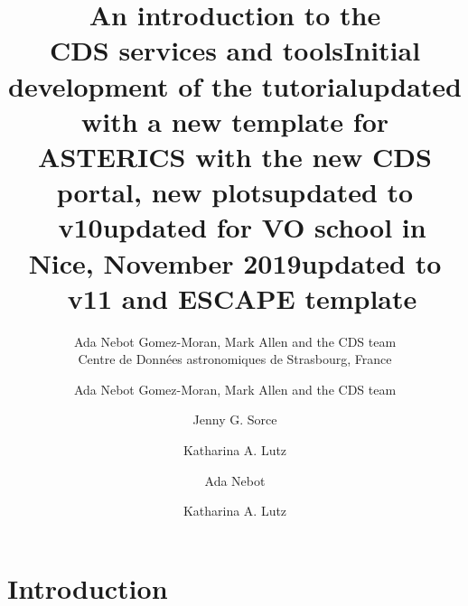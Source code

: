 \documentclass [a4paper, 12pt]{article}
\begin{document}
\author{Ada Nebot Gomez-Moran, Mark Allen and the CDS team \\      %
Centre de Donn\'ees astronomiques de Strasbourg, France}       %
\title{An introduction to the \\ CDS services and tools}   %
\makeescapetitle

\newpage
\author{Ada Nebot Gomez-Moran, Mark Allen and the CDS team}   %
\title{Initial development of the tutorial}  %
\addescapehistory
\author{Jenny G. Sorce}
\title{updated with a new template for ASTERICS with the new CDS portal, new plots}
\addescapehistory
\author{Katharina A. Lutz}
\title{updated to \aladin\ v10}
\addescapehistory
\author{Ada Nebot}
\title{updated for VO school in Nice, November 2019}
\addescapehistory
\author{Katharina A. Lutz}
\title{updated to \aladin\ v11 and ESCAPE template}
\addescapehistory
\newpage
\tableofcontents

\newpage
\section{Introduction}
\end{document}
